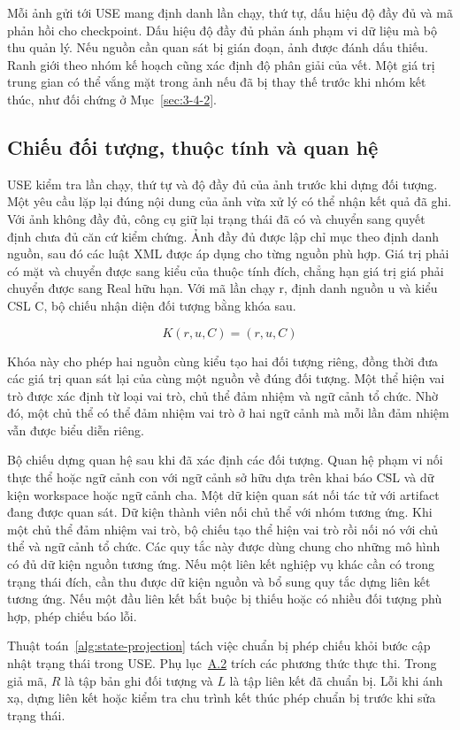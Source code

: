 \documentclass[12pt,a4paper,oneside]{extreport}
\begin{document}
Mỗi ảnh gửi tới USE mang định danh lần chạy, thứ tự, dấu hiệu độ đầy đủ và mã phản hồi cho checkpoint. Dấu hiệu độ đầy đủ phản ánh phạm vi dữ liệu mà bộ thu quản lý. Nếu nguồn cần quan sát bị gián đoạn, ảnh được đánh dấu thiếu. Ranh giới theo nhóm kế hoạch cũng xác định độ phân giải của vết. Một giá trị trung gian có thể vắng mặt trong ảnh nếu đã bị thay thế trước khi nhóm kết thúc, như đối chứng ở Mục~\ref{sec:3-4-2}.

\subsection{Chiếu đối tượng, thuộc tính và quan hệ}\label{sec:2-6-3}

USE kiểm tra lần chạy, thứ tự và độ đầy đủ của ảnh trước khi dựng đối tượng. Một yêu cầu lặp lại đúng nội dung của ảnh vừa xử lý có thể nhận kết quả đã ghi. Với ảnh không đầy đủ, công cụ giữ lại trạng thái đã có và chuyển sang quyết định chưa đủ căn cứ kiểm chứng. Ảnh đầy đủ được lập chỉ mục theo định danh nguồn, sau đó các luật XML được áp dụng cho từng nguồn phù hợp. Giá trị phải có mặt và chuyển được sang kiểu của thuộc tính đích, chẳng hạn giá trị giá phải chuyển được sang Real hữu hạn. Với mã lần chạy r, định danh nguồn u và kiểu CSL C, bộ chiếu nhận diện đối tượng bằng khóa sau.

\[K(r,u,C) = (r,u,C)\]

Khóa này cho phép hai nguồn cùng kiểu tạo hai đối tượng riêng, đồng thời đưa các giá trị quan sát lại của cùng một nguồn về đúng đối tượng. Một thể hiện vai trò được xác định từ loại vai trò, chủ thể đảm nhiệm và ngữ cảnh tổ chức. Nhờ đó, một chủ thể có thể đảm nhiệm vai trò ở hai ngữ cảnh mà mỗi lần đảm nhiệm vẫn được biểu diễn riêng.

Bộ chiếu dựng quan hệ sau khi đã xác định các đối tượng. Quan hệ phạm vi nối thực thể hoặc ngữ cảnh con với ngữ cảnh sở hữu dựa trên khai báo CSL và dữ kiện workspace hoặc ngữ cảnh cha. Một dữ kiện quan sát nối tác tử với artifact đang được quan sát. Dữ kiện thành viên nối chủ thể với nhóm tương ứng. Khi một chủ thể đảm nhiệm vai trò, bộ chiếu tạo thể hiện vai trò rồi nối nó với chủ thể và ngữ cảnh tổ chức. Các quy tắc này được dùng chung cho những mô hình có đủ dữ kiện nguồn tương ứng. Nếu một liên kết nghiệp vụ khác cần có trong trạng thái đích, cần thu được dữ kiện nguồn và bổ sung quy tắc dựng liên kết tương ứng. Nếu một đầu liên kết bắt buộc bị thiếu hoặc có nhiều đối tượng phù hợp, phép chiếu báo lỗi.

Thuật toán~\ref{alg:state-projection} tách việc chuẩn bị phép chiếu khỏi bước cập nhật trạng thái trong USE. Phụ lục~\hyperref[app:projection-source]{A.2} trích các phương thức thực thi. Trong giả mã, \(R\) là tập bản ghi đối tượng và \(L\) là tập liên kết đã chuẩn bị. Lỗi khi ánh xạ, dựng liên kết hoặc kiểm tra chu trình kết thúc phép chuẩn bị trước khi sửa trạng thái.
\end{document}

